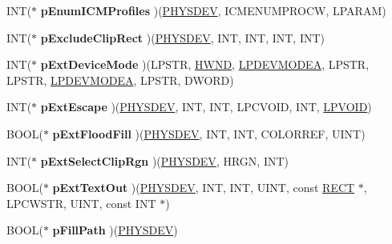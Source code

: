 \begin{DoxyCompactItemize}
I\+NT($\ast$ {\bfseries p\+Enum\+I\+C\+M\+Profiles} )(\hyperlink{structgdi__physdev}{P\+H\+Y\+S\+D\+EV}, I\+C\+M\+E\+N\+U\+M\+P\+R\+O\+CW, L\+P\+A\+R\+AM)
\item 
\mbox{\label{structgdi__dc__funcs_a66f786cd89397a222b051a5aa97f6951}} 
I\+NT($\ast$ {\bfseries p\+Exclude\+Clip\+Rect} )(\hyperlink{structgdi__physdev}{P\+H\+Y\+S\+D\+EV}, I\+NT, I\+NT, I\+NT, I\+NT)
\item 
\mbox{\label{structgdi__dc__funcs_a3f76f684b2233d1363a323c163e8a910}} 
I\+NT($\ast$ {\bfseries p\+Ext\+Device\+Mode} )(L\+P\+S\+TR, \hyperlink{interfacevoid}{H\+W\+ND}, \hyperlink{struct__devicemode_a}{L\+P\+D\+E\+V\+M\+O\+D\+EA}, L\+P\+S\+TR, L\+P\+S\+TR, \hyperlink{struct__devicemode_a}{L\+P\+D\+E\+V\+M\+O\+D\+EA}, L\+P\+S\+TR, D\+W\+O\+RD)
\item 
\mbox{\label{structgdi__dc__funcs_aca0652745dc6f3aa427eec9ff2fbfcea}} 
I\+NT($\ast$ {\bfseries p\+Ext\+Escape} )(\hyperlink{structgdi__physdev}{P\+H\+Y\+S\+D\+EV}, I\+NT, I\+NT, L\+P\+C\+V\+O\+ID, I\+NT, \hyperlink{interfacevoid}{L\+P\+V\+O\+ID})
\item 
\mbox{\label{structgdi__dc__funcs_ab2595815a0847daa0af0ee7ece8a152e}} 
B\+O\+OL($\ast$ {\bfseries p\+Ext\+Flood\+Fill} )(\hyperlink{structgdi__physdev}{P\+H\+Y\+S\+D\+EV}, I\+NT, I\+NT, C\+O\+L\+O\+R\+R\+EF, U\+I\+NT)
\item 
\mbox{\label{structgdi__dc__funcs_aca137d3b5e52ce49f97c0d67adc9115b}} 
I\+NT($\ast$ {\bfseries p\+Ext\+Select\+Clip\+Rgn} )(\hyperlink{structgdi__physdev}{P\+H\+Y\+S\+D\+EV}, H\+R\+GN, I\+NT)
\item 
\mbox{\label{structgdi__dc__funcs_a83e0b6babdf934c120947fd9487e287e}} 
B\+O\+OL($\ast$ {\bfseries p\+Ext\+Text\+Out} )(\hyperlink{structgdi__physdev}{P\+H\+Y\+S\+D\+EV}, I\+NT, I\+NT, U\+I\+NT, const \hyperlink{structtag_r_e_c_t}{R\+E\+CT} $\ast$, L\+P\+C\+W\+S\+TR, U\+I\+NT, const I\+NT $\ast$)
\item 
\mbox{\label{structgdi__dc__funcs_aa3564c8cd4277422e5db97307d680273}} 
B\+O\+OL($\ast$ {\bfseries p\+Fill\+Path} )(\hyperlink{structgdi__physdev}{P\+H\+Y\+S\+D\+EV})

\end{DoxyCompactItemize}
